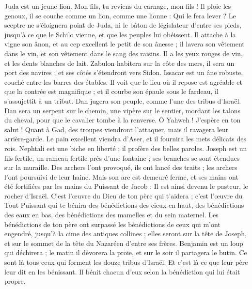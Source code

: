 \begin{multicols}{2}
Juda est un jeune lion. Mon fils, tu reviens du carnage, mon fils ! Il ploie les genoux, il se couche comme un lion, comme une lionne : Qui le fera lever ?
Le sceptre ne s'éloignera point de Juda, ni le bâton de législateur d'entre ses pieds, jusqu'à ce que le Schilo vienne, et que les peuples lui obéissent.
Il attache à la vigne son ânon, et au cep excellent le petit de son ânesse ; il lavera son vêtement dans le vin, et son vêtement dans le sang des raisins.
Il a les yeux rouges de vin, et les dents blanches de lait.
Zabulon habitera sur la côte des mers, il sera un port des navires ; et ses côtés s'étendront vers Sidon.
Issacar est un âne robuste, couché entre les barres des étables.
Il voit que le lieu où il repose est agréable et que la contrée est magnifique ; et il courbe son épaule sous le fardeau, il s'assujettit à un tribut.
Dan jugera son peuple, comme l'une des tribus d'Israël.
Dan sera un serpent sur le chemin, une vipère sur le sentier, mordant les talons du cheval, pour que le cavalier tombe à la renverse.
Ô Yahweh ! J'espère en ton salut !
Quant à Gad, des troupes viendront l'attaquer, mais il ravagera leur arrière-garde.
Le pain excellent viendra d'Aser, et il fournira les mets délicats des rois.
Nephtali est une biche en liberté ; il profère des belles paroles.
Joseph est un fils fertile, un rameau fertile près d'une fontaine ; ses branches se sont étendues sur la muraille.
Des archers l'ont provoqué, ils ont lancé des traits ; les archers l'ont poursuivi de leur haine.
Mais son arc est demeuré ferme, et ses mains ont été fortifiées par les mains du Puissant de Jacob : Il est ainsi devenu le pasteur, le rocher d'Israël.
C'est l'œuvre du Dieu de ton père qui t'aidera ; c'est l'œuvre du Tout-Puissant qui te bénira des bénédictions des cieux en haut, des bénédictions des eaux en bas, des bénédictions des mamelles et du sein maternel.
Les bénédictions de ton père ont surpassé les bénédictions de ceux qui m'ont engendré, jusqu'à la cime des antiques collines ; elles seront sur la tête de Joseph, et sur le sommet de la tête du Nazaréen d'entre ses frères.
Benjamin est un loup qui déchirera ; le matin il dévorera la proie, et sur le soir il partagera le butin.
Ce sont là tous ceux qui forment les douze tribus d'Israël. Et c'est là ce que leur père leur dit en les bénissant. Il bénit chacun d'eux selon la bénédiction qui lui était propre.

\end{multicols}
